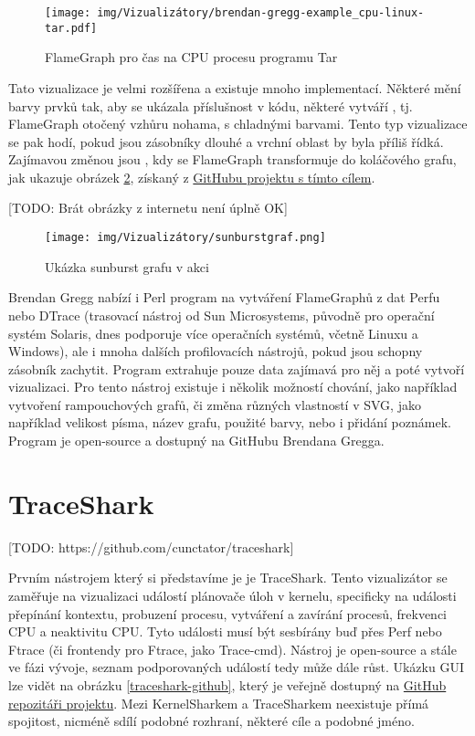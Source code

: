 \begin{figure}[p]\centering
    \texttt{[image: img/Vizualizátory/brendan-gregg-example\_cpu-linux-tar.pdf]}
    \caption{FlameGraph pro čas na CPU procesu programu Tar}
    \label{bg-flamegraf}
\end{figure}

Tato vizualizace je velmi rozšířena a existuje mnoho implementací. Některé mění barvy prvků tak, aby se ukázala příslušnost v kódu, některé vytváří , tj. FlameGraph otočený vzhůru nohama, s chladnými barvami. Tento typ vizualizace se pak hodí, pokud jsou zásobníky dlouhé a vrchní oblast by byla příliš řídká. Zajímavou změnou jsou , kdy se FlameGraph transformuje do koláčového grafu, jak ukazuje obrázek \ref{sunburstgraf}, získaný z \href{https://github.com/Etsukata/d3js_trace?tab=readme-ov-file#readme}{GitHubu projektu s tímto cílem}.

[TODO: Brát obrázky z internetu není úplně OK]
\begin{figure}[p]\centering
    \texttt{[image: img/Vizualizátory/sunburstgraf.png]}
    \caption{Ukázka sunburst grafu v akci}
    \label{sunburstgraf}
\end{figure}

Brendan Gregg nabízí i Perl program na vytváření FlameGraphů z dat Perfu nebo DTrace (trasovací nástroj od Sun Microsystems, původně pro operační systém Solaris, dnes podporuje více operačních systémů, včetně Linuxu a Windows), ale i mnoha dalších profilovacích nástrojů, pokud jsou schopny zásobník zachytit. Program extrahuje pouze data zajímavá pro něj a poté vytvoří vizualizaci. Pro tento nástroj existuje i několik možností chování, jako například vytvoření rampouchových grafů, či změna různých vlastností v SVG, jako například velikost písma, název grafu, použité barvy, nebo i přidání poznámek. Program je open-source a dostupný na GitHubu Brendana Gregga.

\section{TraceShark}

[TODO: https://github.com/cunctator/traceshark]

Prvním  nástrojem který si představíme je je TraceShark. Tento vizualizátor se zaměřuje na vizualizaci událostí plánovače úloh v kernelu, specificky na události přepínání kontextu, probuzení procesu, vytváření a zavírání procesů, frekvenci CPU a neaktivitu CPU. Tyto události musí být sesbírány buď přes Perf nebo Ftrace (či frontendy pro Ftrace, jako Trace-cmd). Nástroj je open-source a stále ve fázi vývoje, seznam podporovaných událostí tedy může dále růst. Ukázku GUI lze vidět na obrázku \ref{traceshark-github}, který je veřejně dostupný na \href{https://github.com/cunctator/traceshark/blob/master/doc/ts-screenshot5.png}{GitHub repozitáři projektu}. Mezi KernelSharkem a TraceSharkem neexistuje přímá spojitost, nicméně sdílí podobné rozhraní, některé cíle a podobné jméno.

